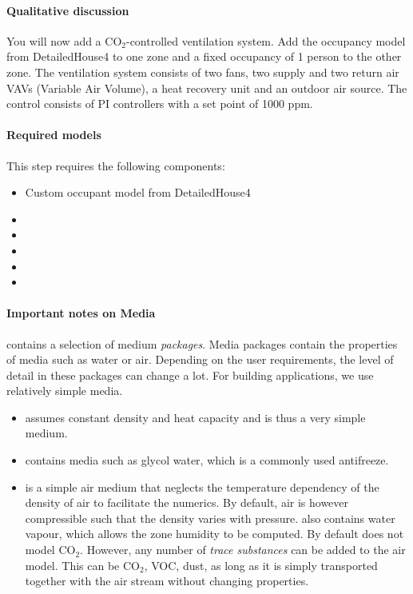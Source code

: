 \documentclass[10pt,a4paper]{article}
\begin{document}
\paragraph{Qualitative discussion}
You will now add a CO$_2$-controlled ventilation system.
Add the occupancy model from DetailedHouse4 to one zone
and a fixed occupancy of 1 person to the other zone.
The ventilation system consists of two fans, two supply and two return air
VAVs (Variable Air Volume), a heat recovery unit and an outdoor air source.
The control consists of PI controllers with a set point of 1000 ppm.

\paragraph{Required models}
This step requires the following components:
\begin{itemize}
\item Custom occupant model from DetailedHouse4
\item {}
\item {}
\item {}
\item {}
\item {}
\end{itemize}

\paragraph{Important notes on Media}
 contains a selection of medium \textit{packages}. 
Media packages contain the properties of media such as water or air.
Depending on the user requirements, the level of detail in these packages can change a lot.
For building applications, we use relatively simple media.
\begin{itemize}
	\item {} assumes constant density and heat capacity and is thus
	a very simple medium.
	\item {} contains media such as glycol water,
	which is a commonly used antifreeze.
	\item {} is a simple air medium that 
	neglects the temperature dependency of the density of air to
	facilitate the numerics. By default, air is however compressible such that the density
	varies with pressure.
	 also contains water vapour,
	which allows the zone humidity to be computed. By default  does not model CO$_2$.
	However, any number of \textit{trace substances} can be added to the air model.
	This can be CO$_2$, VOC, dust, as long as it is simply transported together
	with the air stream without changing properties.
\end{itemize}
\end{document}

